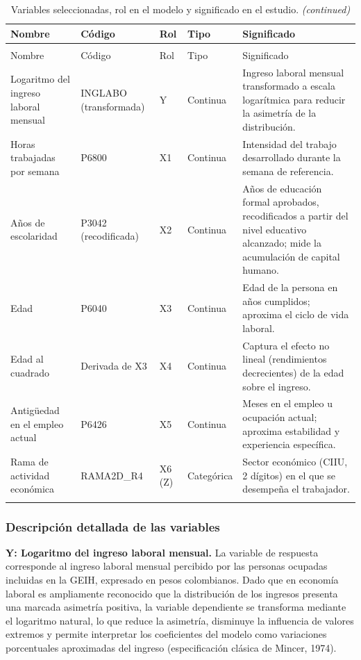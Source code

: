 \documentclass[
  spanish,
  letterpaper,
  DIV=11,
  numbers=noendperiod]{scrartcl}
\begin{document}
\begin{longtable}[t]{>{\raggedright\arraybackslash}p{3.3cm}>{\raggedright\arraybackslash}p{3cm}>{\centering\arraybackslash}p{1cm}>{\centering\arraybackslash}p{1.8cm}>{\raggedright\arraybackslash}p{5.3cm}}
\caption{\label{tab:tabla-variables}Variables seleccionadas, rol en el modelo y significado en el estudio.}\\
\toprule
Nombre & Código & Rol & Tipo & Significado\\
\midrule
\endfirsthead
\caption[]{Variables seleccionadas, rol en el modelo y significado en el estudio. \textit{(continued)}}\\
\toprule
Nombre & Código & Rol & Tipo & Significado\\
\midrule
\endhead

\endfoot
\bottomrule
\endlastfoot
Logaritmo del ingreso laboral mensual & INGLABO (transformada) & Y & Continua & Ingreso laboral mensual transformado a escala logarítmica para reducir la asimetría de la distribución.\\
Horas trabajadas por semana & P6800 & X1 & Continua & Intensidad del trabajo desarrollado durante la semana de referencia.\\
Años de escolaridad & P3042 (recodificada) & X2 & Continua & Años de educación formal aprobados, recodificados a partir del nivel educativo alcanzado; mide la acumulación de capital humano.\\
Edad & P6040 & X3 & Continua & Edad de la persona en años cumplidos; aproxima el ciclo de vida laboral.\\
Edad al cuadrado & Derivada de X3 & X4 & Continua & Captura el efecto no lineal (rendimientos decrecientes) de la edad sobre el ingreso.\\
\addlinespace
Antigüedad en el empleo actual & P6426 & X5 & Continua & Meses en el empleo u ocupación actual; aproxima estabilidad y experiencia específica.\\
Rama de actividad económica & RAMA2D\_R4 & X6 (Z) & Categórica & Sector económico (CIIU, 2 dígitos) en el que se desempeña el trabajador.\\*
\end{longtable}
\endgroup{}

\subsubsection{Descripción detallada de las
variables}\label{descripciuxf3n-detallada-de-las-variables}

\textbf{Y: Logaritmo del ingreso laboral mensual.} La variable de
respuesta corresponde al ingreso laboral mensual percibido por las
personas ocupadas incluidas en la GEIH, expresado en pesos colombianos.
Dado que en economía laboral es ampliamente reconocido que la
distribución de los ingresos presenta una marcada asimetría positiva, la
variable dependiente se transforma mediante el logaritmo natural, lo que
reduce la asimetría, disminuye la influencia de valores extremos y
permite interpretar los coeficientes del modelo como variaciones
porcentuales aproximadas del ingreso (especificación clásica de Mincer,
1974).
\end{document}
